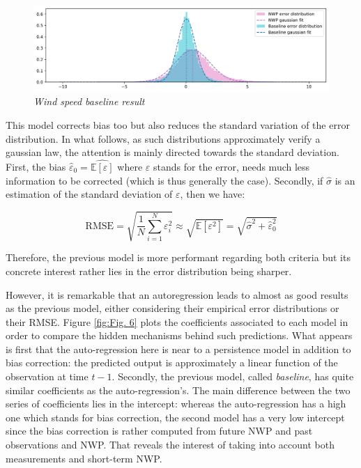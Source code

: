 \documentclass{article}
\newcommand{\saut}{\vspace{10px}}
\begin{document}
\begin{figure}[H]
    \centering
    \includegraphics[width=\linewidth]{img/baseline.png}
    \caption{\textit{Wind speed baseline result}}
    \label{fig:Fig. 5}
\end{figure}

This model corrects bias too but also reduces the standard variation of the error distribution. In what follows,
as such distributions approximately verify a gaussian law, the attention is mainly directed towards the standard
deviation. First, the bias $\hat \varepsilon_0 = \widehat{\mathbb E [ \varepsilon ]}$
where $\varepsilon$ stands for the error,
needs much less information to be corrected (which is thus generally the case). Secondly, if $\hat \sigma$ is an estimation
of the standard deviation of $\varepsilon$, then we have:

\[
	\mathrm{RMSE} = \sqrt{\frac{1}{N} \sum_{i = 1}^N \varepsilon^2_i} \approx \sqrt{ \mathbb E [\varepsilon^2] }
	= \sqrt{\hat \sigma^2 + \hat \varepsilon^2_0}
\]

Therefore, the previous model is more performant regarding both criteria but its concrete interest
rather lies in the error distribution being sharper.

\saut

However, it is remarkable that an autoregression leads to almost as good results as the previous model, either
considering their empirical error distributions or their RMSE. Figure \ref{fig:Fig. 6} plots the coefficients associated to
each model in order to compare the hidden mechanisms behind such predictions. What appears is first that
the auto-regression here is near to a persistence model in addition to bias correction: the predicted output is
approximately a linear function of the observation at time $t - 1$. Secondly, the previous model, called \emph{baseline},
has quite similar coefficients as the auto-regression's. The main difference between the two series of coefficients
lies in the intercept: whereas the auto-regression has a high one which stands for bias correction, the second model
has a very low intercept since the bias correction is rather computed from future NWP and past observations and NWP.
That reveals the interest of taking into account both measurements and short-term NWP.
\end{document}
